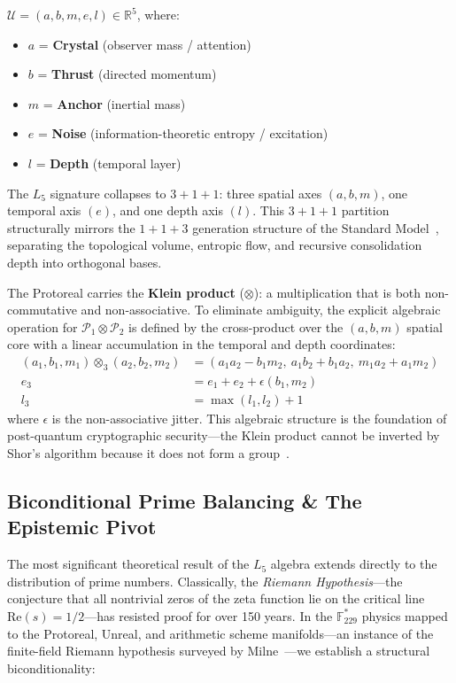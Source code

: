 \begin{definition}
$\mathcal{U} = (a, b, m, e, l) \in \mathbb{R}^5$, where:
\begin{itemize}
    \item $a$ = \textbf{Crystal} (observer mass / attention)
    \item $b$ = \textbf{Thrust} (directed momentum)
    \item $m$ = \textbf{Anchor} (inertial mass)
    \item $e$ = \textbf{Noise} (information-theoretic entropy / excitation)
    \item $l$ = \textbf{Depth} (temporal layer)
\end{itemize}
The $L_5$ signature collapses to $3 + 1 + 1$: three spatial axes $(a, b, m)$, one temporal axis $(e)$, and one depth axis $(l)$. This $3+1+1$ partition structurally mirrors the $1+1+3$ generation structure of the Standard Model~\cite{PDG2025}, separating the topological volume, entropic flow, and recursive consolidation depth into orthogonal bases.
\end{definition}

The Protoreal carries the \textbf{Klein product} ($\otimes$): a multiplication that is both non-commutative and non-associative. To eliminate ambiguity, the explicit algebraic operation for $\mathcal{P}_1 \otimes \mathcal{P}_2$ is defined by the cross-product over the $(a, b, m)$ spatial core with a linear accumulation in the temporal and depth coordinates:
\begin{align}
    (a_1, b_1, m_1) \otimes_3 (a_2, b_2, m_2) &= (a_1 a_2 - b_1 m_2, \ a_1 b_2 + b_1 a_2, \ m_1 a_2 + a_1 m_2) \\
    e_3 &= e_1 + e_2 + \epsilon(b_1, m_2) \\
    l_3 &= \max(l_1, l_2) + 1
\end{align}
where $\epsilon$ is the non-associative jitter. This algebraic structure is the foundation of post-quantum cryptographic security---the Klein product cannot be inverted by Shor's algorithm because it does not form a group~\cite{Aingel}.

\subsection{Biconditional Prime Balancing \& The Epistemic Pivot}

The most significant theoretical result of the $L_5$ algebra extends directly to the distribution of prime numbers. Classically, the \emph{Riemann Hypothesis}---the conjecture that all nontrivial zeros of the zeta function lie on the critical line $\text{Re}(s) = 1/2$---has resisted proof for over 150 years. In the $\mathbb{F}_{229}^*$ physics mapped to the Protoreal, Unreal, and arithmetic scheme manifolds---an instance of the finite-field Riemann hypothesis surveyed by Milne~\cite{Milne2015}---we establish a structural biconditionality:

